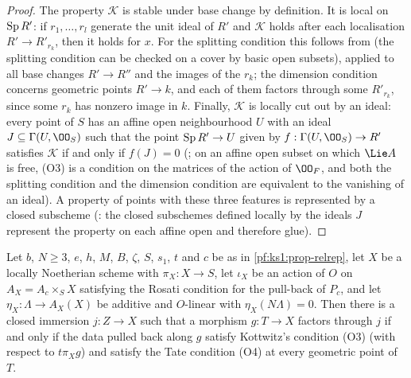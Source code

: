 \begin{proof}
The property $\mathcal K$ is stable under base change by definition. It is local on $\operatorname{Sp} R'$: if $r_1,\dots,r_l$ generate the unit ideal of
$R'$ and $\mathcal K$ holds after each localisation $R'\to R'_{r_k}$, then it holds for $x$. For the splitting condition this follows from
 (the splitting condition can be checked on a cover by basic open
subsets), applied to all base changes $R'\to R''$ and the images of the $r_k$; the dimension condition concerns geometric points
$R'\to k$, and each of them factors through some $R'_{r_k}$, since some $r_k$ has nonzero image in $k$. Finally, $\mathcal K$ is locally cut out
by an ideal: every point of $S$ has an affine open neighbourhood $U$ with an ideal $J\subseteq\Gamma(U,\OO_S)$ such that the point
$\operatorname{Sp} R'\to U$ given by $f:\Gamma(U,\OO_S)\to R'$ satisfies $\mathcal K$ if and only if $f(J)=0$
(; on an affine open subset on which $\Lie A$ is free, (O3) is a condition
on the matrices of the action of $\OO_F$, and both the splitting condition and the dimension condition are equivalent to the vanishing of an
ideal). A property of points with these three features is represented by a closed subscheme
(: the closed subschemes defined locally by the ideals $J$ represent the property
on each affine open and therefore glue).
\end{proof}

\begin{proposition}\label{pf:ks1:prop-lieclosed}
Let $b$, $N\ge3$, $e$, $h$, $M$, $B$, $\zeta$, $S$, $s_1$, $t$ and $c$ be as in \cref{pf:ks1:prop-relrep}, let $X$ be a locally Noetherian scheme with
$\pi_X:X\to S$, let $\iota_X$ be an action of $O$ on $A_X=A_c\times_SX$ satisfying the Rosati condition for the pull-back of $P_c$, and let
$\eta_X:\Lambda\to A_X(X)$ be additive and $O$-linear with $\eta_X(N\Lambda)=0$. Then there is a closed immersion $j:Z\to X$ such that a morphism
$g:T\to X$ factors through $j$ if and only if the data pulled back along $g$ satisfy Kottwitz's condition (O3) (with respect to $t\pi_Xg$) and
satisfy the Tate condition (O4) at every geometric point of $T$.
\end{proposition}


